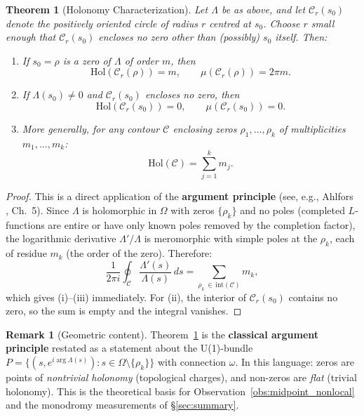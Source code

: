 \documentclass[11pt, a4paper]{article}
\theoremstyle{definition}
\newtheorem{remark}{Remark}[section]
\theoremstyle{plain}
\newtheorem{theorem}{Theorem}[section]
\begin{document}
\begin{theorem}[Holonomy Characterization]
\label{thm:holonomy}
Let $\Lambda$ be as above, and let $\mathcal{C}_r(s_0)$ denote
the positively oriented circle of radius $r$ centred at $s_0$.
Choose $r$ small enough that $\mathcal{C}_r(s_0)$ encloses no zero
other than (possibly) $s_0$ itself. Then:
\begin{enumerate}
  \item[\textup{(i)}] If $s_0 = \rho$ is a zero of $\Lambda$ of
    order $m$, then
    \begin{equation}
      \mathrm{Hol}(\mathcal{C}_r(\rho)) = m,
      \qquad
      \mu(\mathcal{C}_r(\rho)) = 2\pi m.
      \label{eq:hol_zero}
    \end{equation}
  \item[\textup{(ii)}] If $\Lambda(s_0) \neq 0$ and $\mathcal{C}_r(s_0)$
    encloses no zero, then
    \begin{equation}
      \mathrm{Hol}(\mathcal{C}_r(s_0)) = 0,
      \qquad
      \mu(\mathcal{C}_r(s_0)) = 0.
      \label{eq:hol_nonzero}
    \end{equation}
  \item[\textup{(iii)}] More generally, for any contour $\mathcal{C}$
    enclosing zeros $\rho_1, \ldots, \rho_k$ of multiplicities
    $m_1, \ldots, m_k$:
    \begin{equation}
      \mathrm{Hol}(\mathcal{C}) = \sum_{j=1}^{k} m_j.
      \label{eq:hol_general}
    \end{equation}
\end{enumerate}
\end{theorem}

\begin{proof}
This is a direct application of the \textbf{argument principle}
(see, e.g., Ahlfors \cite{ahlfors1979}, Ch.~5). Since $\Lambda$
is holomorphic in $\Omega$ with zeros $\{\rho_k\}$ and no poles
(completed $L$-functions are entire or have only known poles removed
by the completion factor), the logarithmic derivative
$\Lambda'/\Lambda$ is meromorphic with simple poles at the $\rho_k$,
each of residue $m_k$ (the order of the zero). Therefore:
\[
  \frac{1}{2\pi i}\oint_{\mathcal{C}}
  \frac{\Lambda'(s)}{\Lambda(s)}\,ds
  = \sum_{\rho_k \,\in\, \mathrm{int}(\mathcal{C})} m_k,
\]
which gives (i)--(iii) immediately. For (ii), the interior
of $\mathcal{C}_r(s_0)$ contains no zero, so the sum is empty
and the integral vanishes.
\end{proof}

\begin{remark}[Geometric content]
\label{rem:hol_geometric}
Theorem~\ref{thm:holonomy} is the \textbf{classical argument principle}
restated as a statement about the U(1)-bundle
$P = \{(s, e^{i\arg\Lambda(s)}) : s \in \Omega\setminus\{\rho_k\}\}$
with connection $\omega$. In this language: zeros are points of
\emph{nontrivial holonomy} (topological charges), and non-zeros are
\emph{flat} (trivial holonomy). This is the theoretical basis for
Observation~\ref{obs:midpoint_nonlocal} and the monodromy measurements
of \S\ref{sec:summary}.
\end{remark}
\end{document}
